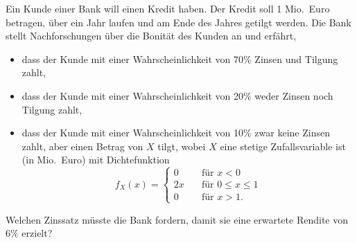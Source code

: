\newcommand{\woche}{}
\newcommand{\nr}{2}
\newcommand{\thema}{}


\begin{Exercise}
Ein Kunde einer Bank will einen Kredit haben. Der Kredit soll 1 Mio.\
Euro betragen, \"{u}ber ein Jahr laufen und am Ende des Jahres getilgt
werden. Die Bank stellt Nachforschungen \"{u}ber die Bonit\"{a}t des Kunden
an und erf\"{a}hrt,

\begin{itemize}
	\item dass der Kunde mit einer Wahrscheinlichkeit von 70\% Zinsen und Tilgung zahlt,
	\item dass der Kunde mit einer Wahrscheinlichkeit von 20\% weder Zinsen noch Tilgung zahlt,
	\item dass der Kunde mit einer Wahrscheinlichkeit von 10\% zwar keine Zinsen
	zahlt, aber einen Betrag von $X$ tilgt, wobei $X$ eine stetige
	Zufallsvariable ist (in Mio.\ Euro) mit Dichtefunktion%
	\begin{equation*}
		f_{X}\left( x\right) =\left\{ 
		\begin{array}{ll}
			0 & \quad \text{f\"{u}r }x<0 \\ 
			2x & \quad \text{f\"{u}r }0\leq x\leq 1 \\ 
			0 & \quad \text{f\"{u}r }x>1.%
		\end{array}%
		\right.
	\end{equation*}
\end{itemize}

Welchen Zinssatz m\"{u}sste die Bank fordern, damit sie eine erwartete
Rendite von 6\% erzielt?
\end{Exercise}

